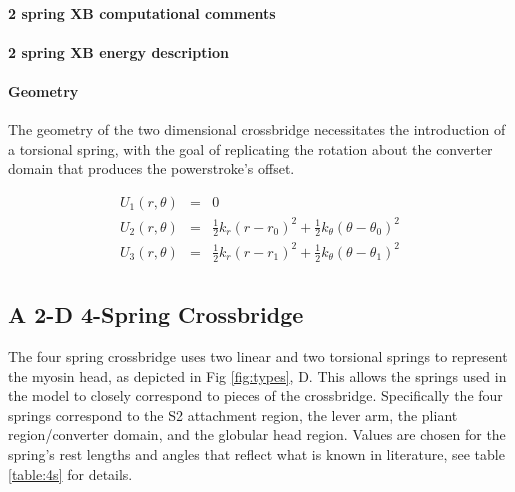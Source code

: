 \documentclass[]{article}
\begin{document}
\paragraph*{2 spring XB computational comments} %
\label{par:2_spring_xb_computational_comments}


\paragraph*{2 spring XB energy description} %
\label{par:2_spring_xb_energy_description}


\paragraph*{Geometry}

The geometry of the two dimensional crossbridge necessitates the introduction of a torsional spring, with the goal of replicating the rotation about the converter domain that produces the powerstroke's offset.


\begin{eqnarray}
\label{2sEnergy}
	U_1(r,\theta) & = & 0 \nonumber \\
    U_2(r,\theta) & = & \frac{1}{2}k_r (r - r_0)^2 + 
                        \frac{1}{2}k_\theta (\theta - \theta_0)^2 \nonumber \\
    U_3(r,\theta) & = & \frac{1}{2}k_r (r - r_1)^2 + 
                        \frac{1}{2}k_\theta (\theta - \theta_1)^2 \\
\end{eqnarray}


\subsection*{A 2-D 4-Spring Crossbridge} %
\label{sub:a_2_d_4_spring_crossbridge}

The four spring crossbridge uses two linear and two torsional springs to represent the myosin head, as depicted in Fig \ref{fig:types}, D. 
This allows the springs used in the model to closely correspond to pieces of the crossbridge. 
Specifically the four springs correspond to the S2 attachment region, the lever arm, the pliant region/converter domain, and the globular head region.
Values are chosen for the spring's rest lengths and angles that reflect what is known in literature, see table \ref{table:4s} for details.
\end{document}
